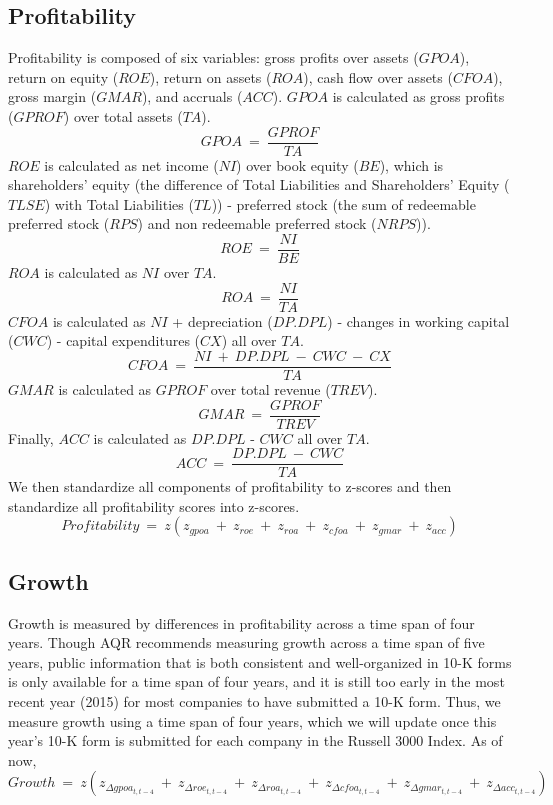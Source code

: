\documentclass[titlepage]{article}
\begin{document}
\subsection*{Profitability}
Profitability is composed of six variables: gross profits over assets ($GPOA$), return on equity ($ROE$), return on assets ($ROA$), cash flow over assets ($CFOA$), gross margin ($GMAR$), and accruals ($ACC$). $GPOA$ is calculated as gross profits ($GPROF$) over total assets ($TA$). $$GPOA \ = \ \frac{GPROF}{TA}$$ $ROE$ is calculated as net income ($NI$) over book equity ($BE$), which is shareholders' equity (the difference of Total Liabilities and Shareholders' Equity ($TLSE$) with Total Liabilities ($TL$)) - preferred stock (the sum of redeemable preferred stock ($RPS$) and non redeemable preferred stock ($NRPS$)). $$ROE \ = \ \frac{NI}{BE}$$ $ROA$ is calculated as $NI$ over $TA$. $$ROA \ = \ \frac{NI}{TA}$$ $CFOA$ is calculated as $NI$ + depreciation ($DP.DPL$) - changes in working capital ($CWC$) - capital expenditures ($CX$) all over $TA$. $$CFOA \ = \ \frac{NI \ + \ DP.DPL \ - \ CWC \ - \ CX}{TA}$$ $GMAR$ is calculated as $GPROF$ over total revenue ($TREV$). $$GMAR \ = \ \frac{GPROF}{TREV}$$ Finally, $ACC$ is calculated as $DP.DPL$ - $CWC$ all over $TA$. $$ACC \ = \ \frac{DP.DPL \ - \ CWC}{TA}$$ We then standardize all components of profitability to z-scores and then standardize all profitability scores into z-scores. $$Profitability \ = \ z(z_{gpoa} \ + \ z_{roe} \ + \ z_{roa} \ + \ z_{cfoa} \ + \ z_{gmar} \ + \ z_{acc})$$
\subsection*{Growth}
Growth is measured by differences in profitability across a time span of four years. Though AQR recommends measuring growth across a time span of five years, public information that is both consistent and well-organized in 10-K forms is only available for a time span of four years, and it is still too early in the most recent year (2015) for most companies to have submitted a 10-K form. Thus, we measure growth using a time span of four years, which we will update once this year's 10-K form is submitted for each company in the Russell 3000 Index. As of now, $$Growth \ = \ z(z_{\Delta gpoa_{t,t-4}} \ + \ z_{\Delta roe_{t,t-4}} \ + \ z_{\Delta roa_{t,t-4}} \ + \ z_{\Delta cfoa_{t,t-4}} \ + \ z_{\Delta gmar_{t,t-4}} \ + \ z_{\Delta acc_{t,t-4}})$$
\end{document}
